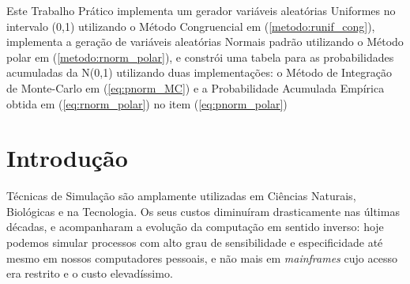 \documentclass[
	article,			%
	12pt,				%
	twoside,			%
	a4paper,			%
	english,			%
	brazil,				%
	]{abntex2}
\begin{document}
\frenchspacing 


%
%
\maketitle

\begin{resumoumacoluna}
    Este Trabalho Prático implementa um gerador variáveis aleatórias Uniformes no intervalo (0,1) utilizando o Método Congruencial em (\ref{metodo:runif_cong}), implementa a geração de variáveis aleatórias Normais padrão utilizando o Método polar em (\ref{metodo:rnorm_polar}), e constrói uma tabela para as probabilidades acumuladas da N(0,1) utilizando duas implementações: o Método de Integração de Monte-Carlo em (\ref{eq:pnorm_MC}) e a Probabilidade Acumulada Empírica obtida em (\ref{eq:rnorm_polar}) no item (\ref{eq:pnorm_polar})
 
 \vspace{\onelineskip}
 
 \noindent
\end{resumoumacoluna}


\textual

\section{Introdução}
    Técnicas de Simulação são amplamente utilizadas em Ciências Naturais, Biológicas e na Tecnologia. Os seus custos diminuíram drasticamente nas últimas décadas, e acompanharam a evolução da computação em sentido inverso: hoje podemos simular processos com alto grau de sensibilidade e especificidade até mesmo em nossos computadores pessoais, e não mais em \textit{mainframes} cujo acesso era restrito e o custo elevadíssimo.
    
\end{document}
